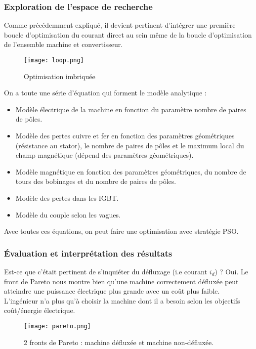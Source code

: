 \subsubsection{Exploration de l'espace de recherche}
Comme précédemment expliqué, il devient pertinent d'intégrer une première boucle d'optimisation du courant direct au sein même de la boucle d'optimisation de l'ensemble machine et convertisseur.
\begin{figure}[H]
    \centering
    \texttt{[image: loop.png]}
    \caption{Optimisation imbriquée}
\end{figure}
On a toute une série d'équation qui forment le modèle analytique :
\begin{itemize}
    \item Modèle électrique de la machine en fonction du paramètre nombre de paires de pôles.
    \item Modèle des pertes cuivre et fer en fonction des paramètres géométriques (résistance au stator), le nombre de paires de pôles et le maximum local du champ magnétique (dépend des paramètres géométriques).
    \item Modèle magnétique en fonction des paramètres géométriques, du nombre de tours des bobinages et du nombre de paires de pôles.
    \item Modèle des pertes dans les IGBT.
    \item Modèle du couple selon les vagues.
\end{itemize}
Avec toutes ces équations, on peut faire une optimisation avec stratégie PSO.

\subsubsection{Évaluation et interprétation des résultats}
Est-ce que c'était pertinent de s'inquiéter du défluxage (i.e courant $i_d$) ? Oui. Le front de Pareto nous montre bien qu'une machine correctement défluxée peut atteindre une puissance électrique plus grande avec un coût plus faible. L'ingénieur n'a plus qu'à choisir la machine dont il a besoin selon les objectifs coût/énergie électrique.
\begin{figure}[H]
    \centering
    \texttt{[image: pareto.png]}
    \caption{2 fronts de Pareto : machine défluxée et machine non-défluxée.}
\end{figure}
